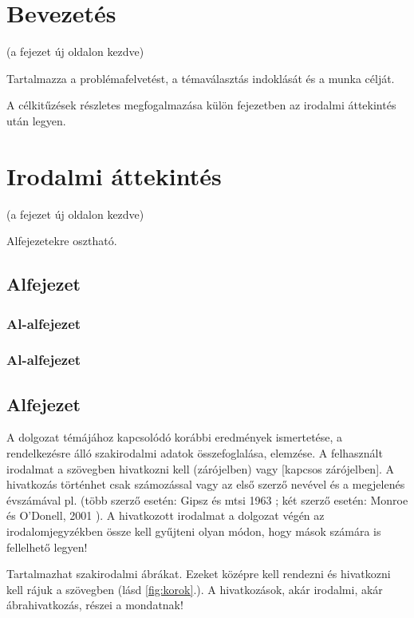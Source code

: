 \documentclass[a4paper,12pt]{report}
\theoremstyle{definition}
\theoremstyle{remark}
\begin{document}
\chapter{Bevezetés}

(a fejezet új oldalon kezdve)

Tartalmazza a problémafelvetést, a témaválasztás indoklását és a munka célját.

A célkitűzések részletes megfogalmazása külön fejezetben az irodalmi áttekintés után legyen.




\chapter{Irodalmi áttekintés}

(a fejezet új oldalon kezdve) 


Alfejezetekre osztható.

\section{Alfejezet}
\subsection{Al-alfejezet}
\subsection{Al-alfejezet}
\section{Alfejezet}



A dolgozat témájához kapcsolódó korábbi eredmények ismertetése, a rendelkezésre álló szakirodalmi adatok összefoglalása, elemzése. 
A felhasznált irodalmat a szövegben hivatkozni kell (zárójelben) vagy [kapcsos zárójelben]. A hivatkozás történhet csak számozással \cite{ALE3} vagy az első szerző nevével és a megjelenés évszámával pl. (több szerző esetén:  Gipsz és mtsi 1963 \cite{WSB}; két szerző esetén: Monroe és O’Donell, 2001 \cite{MD}). A hivatkozott irodalmat a dolgozat végén az irodalomjegyzékben össze kell gyűjteni olyan módon, hogy mások számára is fellelhető legyen!

Tartalmazhat szakirodalmi ábrákat. Ezeket középre kell rendezni és hivatkozni kell rájuk a szövegben (lásd \ref{fig:korok}.). A hivatkozások, akár irodalmi, akár ábrahivatkozás, részei a mondatnak!
\end{document}
